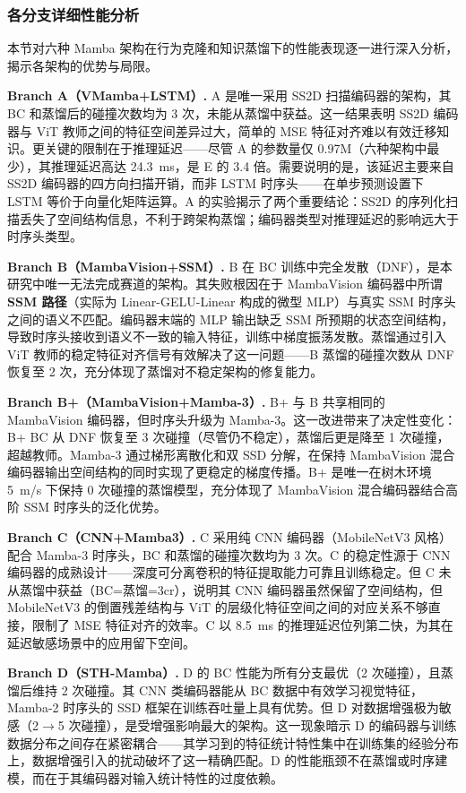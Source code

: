 \documentclass[12pt,a4paper]{article}
\numberwithin{equation}{section}
\numberwithin{figure}{section}
\numberwithin{table}{section}
\begin{document}
\subsubsection{各分支详细性能分析}
\label{sec:branch-analysis}

本节对六种 Mamba 架构在行为克隆和知识蒸馏下的性能表现逐一进行深入分析，揭示各架构的优势与局限。

\textbf{Branch A（VMamba+LSTM）.} A 是唯一采用 SS2D 扫描编码器的架构，其 BC 和蒸馏后的碰撞次数均为 3 次，未能从蒸馏中获益。这一结果表明 SS2D 编码器与 ViT 教师之间的特征空间差异过大，简单的 MSE 特征对齐难以有效迁移知识。更关键的限制在于推理延迟——尽管 A 的参数量仅 0.97M（六种架构中最少），其推理延迟高达 24.3~ms，是 E 的 3.4 倍。需要说明的是，该延迟主要来自 SS2D 编码器的四方向扫描开销，而非 LSTM 时序头——在单步预测设置下 LSTM 等价于向量化矩阵运算。A 的实验揭示了两个重要结论：SS2D 的序列化扫描丢失了空间结构信息，不利于跨架构蒸馏；编码器类型对推理延迟的影响远大于时序头类型。

\textbf{Branch B（MambaVision+SSM）.} B 在 BC 训练中完全发散（DNF），是本研究中唯一无法完成赛道的架构。其失败根因在于 MambaVision 编码器中所谓\textbf{SSM 路径}（实际为 Linear-GELU-Linear 构成的微型 MLP）与真实 SSM 时序头之间的语义不匹配。编码器末端的 MLP 输出缺乏 SSM 所预期的状态空间结构，导致时序头接收到语义不一致的输入特征，训练中梯度振荡发散。蒸馏通过引入 ViT 教师的稳定特征对齐信号有效解决了这一问题——B 蒸馏的碰撞次数从 DNF 恢复至 2 次，充分体现了蒸馏对不稳定架构的修复能力。

\textbf{Branch B+（MambaVision+Mamba-3）.} B+ 与 B 共享相同的 MambaVision 编码器，但时序头升级为 Mamba-3。这一改进带来了决定性变化：B+ BC 从 DNF 恢复至 3 次碰撞（尽管仍不稳定），蒸馏后更是降至 1 次碰撞，超越教师。Mamba-3 通过梯形离散化和双 SSD 分解，在保持 MambaVision 混合编码器输出空间结构的同时实现了更稳定的梯度传播。B+ 是唯一在树木环境 5~m/s 下保持 0 次碰撞的蒸馏模型，充分体现了 MambaVision 混合编码器结合高阶 SSM 时序头的泛化优势。

\textbf{Branch C（CNN+Mamba3）.} C 采用纯 CNN 编码器（MobileNetV3 风格）配合 Mamba-3 时序头，BC 和蒸馏的碰撞次数均为 3 次。C 的稳定性源于 CNN 编码器的成熟设计——深度可分离卷积的特征提取能力可靠且训练稳定。但 C 未从蒸馏中获益（BC=蒸馏=3cr），说明其 CNN 编码器虽然保留了空间结构，但 MobileNetV3 的倒置残差结构与 ViT 的层级化特征空间之间的对应关系不够直接，限制了 MSE 特征对齐的效率。C 以 8.5~ms 的推理延迟位列第二快，为其在延迟敏感场景中的应用留下空间。

\textbf{Branch D（STH-Mamba）.} D 的 BC 性能为所有分支最优（2 次碰撞），且蒸馏后维持 2 次碰撞。其 CNN 类编码器能从 BC 数据中有效学习视觉特征，Mamba-2 时序头的 SSD 框架在训练吞吐量上具有优势。但 D 对数据增强极为敏感（2$\rightarrow$5 次碰撞），是受增强影响最大的架构。这一现象暗示 D 的编码器与训练数据分布之间存在紧密耦合——其学习到的特征统计特性集中在训练集的经验分布上，数据增强引入的扰动破坏了这一精确匹配。D 的性能瓶颈不在蒸馏或时序建模，而在于其编码器对输入统计特性的过度依赖。
\end{document}
